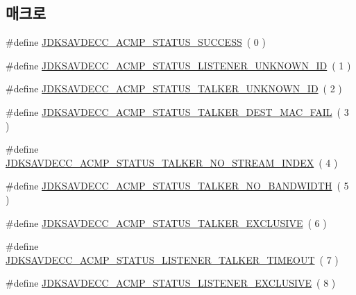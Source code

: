 \subsection*{매크로}
\begin{DoxyCompactItemize}
\item 
\#define \hyperlink{group__acmp__status_gaf66306114de2faa8476897fec5d21cd8}{J\+D\+K\+S\+A\+V\+D\+E\+C\+C\+\_\+\+A\+C\+M\+P\+\_\+\+S\+T\+A\+T\+U\+S\+\_\+\+S\+U\+C\+C\+E\+SS}~( 0 )
\item 
\#define \hyperlink{group__acmp__status_ga0fdc4e5fadabce2c889ad29cd5847ecc}{J\+D\+K\+S\+A\+V\+D\+E\+C\+C\+\_\+\+A\+C\+M\+P\+\_\+\+S\+T\+A\+T\+U\+S\+\_\+\+L\+I\+S\+T\+E\+N\+E\+R\+\_\+\+U\+N\+K\+N\+O\+W\+N\+\_\+\+ID}~( 1 )
\item 
\#define \hyperlink{group__acmp__status_ga6624f88af09e4d2227313b1bbb1b002e}{J\+D\+K\+S\+A\+V\+D\+E\+C\+C\+\_\+\+A\+C\+M\+P\+\_\+\+S\+T\+A\+T\+U\+S\+\_\+\+T\+A\+L\+K\+E\+R\+\_\+\+U\+N\+K\+N\+O\+W\+N\+\_\+\+ID}~( 2 )
\item 
\#define \hyperlink{group__acmp__status_gaf00d7ccec76825509d1cbbbefde44857}{J\+D\+K\+S\+A\+V\+D\+E\+C\+C\+\_\+\+A\+C\+M\+P\+\_\+\+S\+T\+A\+T\+U\+S\+\_\+\+T\+A\+L\+K\+E\+R\+\_\+\+D\+E\+S\+T\+\_\+\+M\+A\+C\+\_\+\+F\+A\+IL}~( 3 )
\item 
\#define \hyperlink{group__acmp__status_ga794430c0bc54e7fad7d9fb45749753f3}{J\+D\+K\+S\+A\+V\+D\+E\+C\+C\+\_\+\+A\+C\+M\+P\+\_\+\+S\+T\+A\+T\+U\+S\+\_\+\+T\+A\+L\+K\+E\+R\+\_\+\+N\+O\+\_\+\+S\+T\+R\+E\+A\+M\+\_\+\+I\+N\+D\+EX}~( 4 )
\item 
\#define \hyperlink{group__acmp__status_ga7edd290d7db953f4bdbfafb86fcac9fd}{J\+D\+K\+S\+A\+V\+D\+E\+C\+C\+\_\+\+A\+C\+M\+P\+\_\+\+S\+T\+A\+T\+U\+S\+\_\+\+T\+A\+L\+K\+E\+R\+\_\+\+N\+O\+\_\+\+B\+A\+N\+D\+W\+I\+D\+TH}~( 5 )
\item 
\#define \hyperlink{group__acmp__status_ga5dc1d109e2a6f9c04a18982483bc90f9}{J\+D\+K\+S\+A\+V\+D\+E\+C\+C\+\_\+\+A\+C\+M\+P\+\_\+\+S\+T\+A\+T\+U\+S\+\_\+\+T\+A\+L\+K\+E\+R\+\_\+\+E\+X\+C\+L\+U\+S\+I\+VE}~( 6 )
\item 
\#define \hyperlink{group__acmp__status_gad3a3f400e13733f01fc04aab3a22c7ea}{J\+D\+K\+S\+A\+V\+D\+E\+C\+C\+\_\+\+A\+C\+M\+P\+\_\+\+S\+T\+A\+T\+U\+S\+\_\+\+L\+I\+S\+T\+E\+N\+E\+R\+\_\+\+T\+A\+L\+K\+E\+R\+\_\+\+T\+I\+M\+E\+O\+UT}~( 7 )
\item 
\#define \hyperlink{group__acmp__status_ga75c487c3c086705e3e374f533b572954}{J\+D\+K\+S\+A\+V\+D\+E\+C\+C\+\_\+\+A\+C\+M\+P\+\_\+\+S\+T\+A\+T\+U\+S\+\_\+\+L\+I\+S\+T\+E\+N\+E\+R\+\_\+\+E\+X\+C\+L\+U\+S\+I\+VE}~( 8 )

\end{DoxyCompactItemize}
